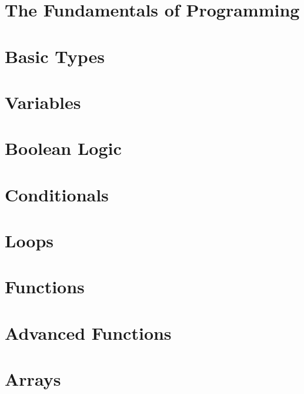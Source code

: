 \documentclass[b5paper,openany]{book}
\begin{document}
\tp


\tableofcontents



\chapter{The Fundamentals of Programming}


\chapter{Basic Types}


\chapter{Variables}


\chapter{Boolean Logic}


\chapter{Conditionals}


\chapter{Loops}



\chapter{Functions}


\chapter{Advanced Functions}


\chapter{Arrays}

\end{document}
